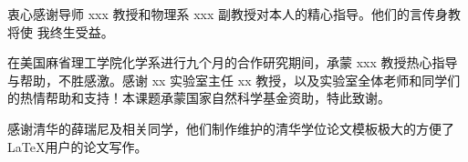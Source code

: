 

\begin{ack}
衷心感谢导师 xxx 教授和物理系 xxx 副教授对本人的精心指导。他们的言传身教将使
  我终生受益。

在美国麻省理工学院化学系进行九个月的合作研究期间，承蒙 xxx 教授热心指导与帮助，不胜感激。感谢 xx 实验室主任 xx 教授，以及实验室全体老师和同学们的热情帮助和支持！本课题承蒙国家自然科学基金资助，特此致谢。

感谢清华的薛瑞尼及相关同学，他们制作维护的清华学位论文模板极大的方便了\LaTeX{}用户的论文写作。	
\end{ack}
